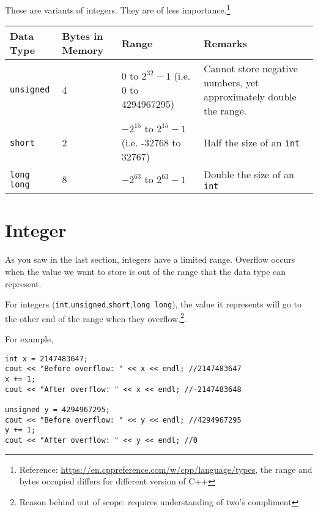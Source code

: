 These are variants of integers. They are of less importance.\footnote{Reference: \href{https://en.cppreference.com/w/cpp/language/types}{https://en.cppreference.com/w/cpp/language/types}, the range and bytes occupied differs for different version of C++}

\begin{table}[h]
    \centering
    \begin{tabular}{|m{6em}|m{6em}|m{10em}|m{12em}|}
        \hline
        \textbf{Data Type} & 
        Bytes in Memory & 
        Range & 
        Remarks 
        \\ \hline \hline
        
        \texttt{unsigned} &
        4 & 
        $0$ to $2^{32}-1$ (i.e. 0 to 4294967295) &
        Cannot store negative numbers, yet approximately double the range.
        \\ \hline
        
        \texttt{short} &
        2 & 
        $-2^{15}$ to $2^{15}-1$ (i.e. -32768 to 32767) &
        Half the size of an \texttt{int}
        \\ \hline
        
        \texttt{long long} &
        8 & 
        $-2^{63}$ to $2^{63}-1$ &
        Double the size of an \texttt{int}
        \\ \hline
        
    \end{tabular}
\end{table}

\section{Integer }

As you saw in the last section, integers have a limited range. Overflow occurs when the value we want to store is out of the range that the data type can represent. 

For integers (\texttt{int},\texttt{unsigned},\texttt{short},\texttt{long long}), the value it represents will go to the other end of the range when they overflow.\footnote{Reason behind out of scope: requires understanding of two's compliment}. 

For example,
\begin{lstlisting}
int x = 2147483647;
cout << "Before overflow: " << x << endl; //2147483647
x += 1;
cout << "After overflow: " << x << endl; //-2147483648

unsigned y = 4294967295;
cout << "Before overflow: " << y << endl; //4294967295
y += 1;
cout << "After overflow: " << y << endl; //0
\end{lstlisting}

